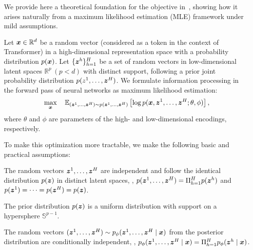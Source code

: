 We provide here a theoretical foundation for the objective in~, showing how it arises naturally from a maximum likelihood estimation (MLE) framework under mild assumptions.

Let ${\bm{x}} \in \mathbb{R}^d$ be a random vector (considered as a token in the context of Transformer) in a high-dimensional representation space with a probability distribution $p({\bm{x}})$. Let $\{{\bm{z}}^h\}_{h=1}^H$ be a set of random vectors in low-dimensional latent spaces $\mathbb{R}^{p} ~(p<d)$ with distinct support, following a prior joint probability distribution $p(z^1, \dots, {\bm{z}}^H)$. We formulate information processing in the forward pass of neural networks as maximum likelihood estimation:
\begin{equation}
\label{eq:mle}
    \max_{{\bm{x}}} \quad \mathbb{E}_{({\bm{z}}^1, \dots,{\bm{z}}^H)\sim p({\bm{z}}^1,\dots,{\bm{z}}^H)}\left[\log p({\bm{x}},{\bm{z}}^1,\dots,{\bm{z}}^H; \theta,\phi)\right],
\end{equation}
where $\theta$ and $\phi$ are parameters of the high- and low-dimensional encodings, respectively.

To make this optimization more tractable, we make the following basic and practical assumptions:
\begin{assumption}
\label{assumption:1}
The random vectors ${\bm{z}}^1,\dots,{\bm{z}}^H$ are independent and follow the identical distribution $p({\bm{z}})$ in distinct latent spaces, \ie, $p({\bm{z}}^1,\dots,{\bm{z}}^H)=\Pi_{h=1}^H p({\bm{z}}^h)$ and $p({\bm{z}}^1)=\dots=p({\bm{z}}^H)=p({\bm{z}})$.
\end{assumption}

\begin{assumption}
\label{assumption:2}
The prior distribution $p({\bm{z}})$ is a uniform distribution with support on a hypersphere $\mathbb{S}^{p-1}$.
\end{assumption}

\begin{assumption}
\label{assumption:3}
The random vectors $({\bm{z}}^1,\dots,{\bm{z}}^H)\sim p_{\phi}({\bm{z}}^1,\dots,{\bm{z}}^H \mid {\bm{x}})$ from the posterior distribution are conditionally independent, \ie, $p_{\phi}({\bm{z}}^1,\dots,{\bm{z}}^H \mid {\bm{x}}) = \Pi_{h=1}^H p_\phi({\bm{z}}^h \mid {\bm{x}})$.
\end{assumption}


